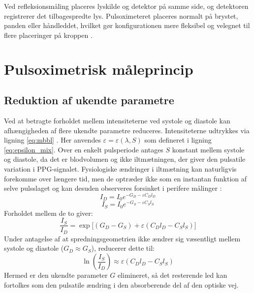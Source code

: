 Ved refleksionsmåling placeres lyskilde og detektor på samme side, og detektoren registrerer det tilbagespredte lys. Pulsoximeteret placeres normalt på brystet, panden eller håndleddet, hvilket gør konfigurationen mere fleksibel og velegnet til flere  placeringer på kroppen \cite[S.~87--88]{Webster1997}.

\section{Pulsoximetrisk måleprincip}
\label{sec:pulseox_princip}

\subsection{Reduktion af ukendte parametre}
Ved at betragte forholdet mellem intensiteterne ved systole og diastole kan afhængigheden af flere ukendte parametre reduceres. Intensiteterne udtrykkes via ligning \ref{eq:mbbl} \cite[s.126--129]{Webster1997}. Her anvendes $\varepsilon = \varepsilon(\lambda, S)$ som defineret i ligning \ref{eq:epsilon_mix}. Over en enkelt pulsperiode antages $S$ konstant mellem systole og diastole, da det er blodvolumen og ikke iltmætningen, der giver den pulsatile variation i PPG-signalet. Fysiologiske ændringer i iltmætning kan naturligvis forekomme over længere tid, men de optræder ikke som en instantan funktion af selve pulsslaget og kan desuden observeres forsinket i perifere målinger \cite[s.~7]{YossefHay2018}:
\begin{equation}
    I_D = I_0 e^{-G_D - \varepsilon C_D l_D}
    \label{eq:i_diastole}
\end{equation}
\begin{equation}
    I_S = I_0 e^{-G_S - \varepsilon C_S l_S}
    \label{eq:i_systole}
\end{equation}
Forholdet mellem de to giver:
\begin{equation}
    \frac{I_S}{I_D} = \exp\!\Big[(G_D - G_S) + \varepsilon(C_D l_D - C_S l_S)\Big]
    \label{eq:is_id_ratio}
\end{equation}
Under antagelse af at spredningsgeometrien ikke ændrer sig væsentligt mellem systole og diastole ($G_D \approx G_S$), reducerer dette til:
\begin{equation}
    \ln\!\left(\frac{I_S}{I_D}\right) \approx \varepsilon(C_D l_D - C_S l_S)
    \label{eq:ln_ratio_simplified}
\end{equation}
Hermed er den ukendte parameter $G$ elimineret, så det resterende led kan fortolkes som den pulsatile ændring i den absorberende del af den optiske vej.


